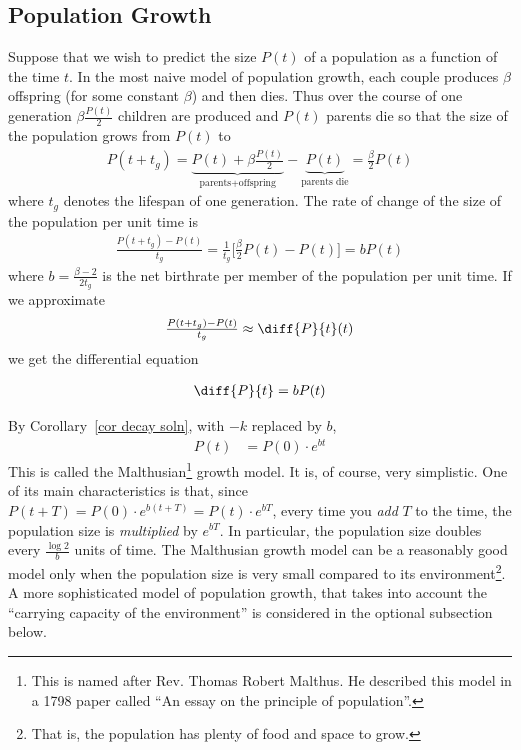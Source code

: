 \subsection{Population Growth}\label{ssec pop}

Suppose that we wish to predict the size $P(t)$ of a
population as a function of the time $t$.
In the most naive model of population growth,  each couple produces
$\beta$ offspring (for some constant $\beta$) and then dies. Thus
over the course of one generation $\beta\tfrac{P(t)}{2}$ children are
produced and $P(t)$ parents die so that the size of the population grows
from  $P(t)$ to
\begin{align*}
  P(t+t_g)= \underbrace{P(t)
+\beta\frac{P(t)}{2}}_{\text{parents+offspring}}-\underbrace{P(t)}_{\text{parents
die}}=\frac{\beta}{ 2 } P(t)
\end{align*}
where $t_g$ denotes the lifespan of one generation. The rate of change
of the size of the population per unit time is
\begin{align*}
  \frac{P(t+t_g)-P(t)}{t_g}
  =\frac{1}{t_g}\Big[\frac{\beta}{2}P(t) -P(t)\Big]
  = b P(t)
\end{align*}
where $ b=\tfrac{\beta-2}{2t_g}$ is the net birthrate per member
of the population per unit time. If we approximate
\begin{align*}
\tfrac{P(t+t_g)-P(t)}{t_g}\approx\diff{P}{t}(t)
\end{align*}
we get the differential equation
\begin{impeqn}\label{eqn simple pop}
\begin{align*}
  \diff{P}{t} = bP(t)
\end{align*}
\end{impeqn}

By Corollary~\ref{cor decay soln}, with $-k$ replaced by $b$,
\begin{align*}
P(t) &= P(0)\cdot e^{bt}
\end{align*}
This is called the Malthusian\footnote{This is named after Rev. Thomas
Robert Malthus. He described this model in a 1798 paper called ``An essay on
the principle of population''.} growth model. It is, of course, very
simplistic. One of its main characteristics is that, since $P(t+T) = P(0)\cdot
e^{b(t+T)} = P(t)\cdot e^{bT}$, every time you \emph{add} $T$ to the time, the
population size is \emph{multiplied} by $e^{bT}$. In particular, the population
size doubles every $\frac{\log 2}{b}$ units of time. The Malthusian growth model
can be a reasonably good model only when the population size is very small
compared to its environment\footnote{That is, the population has plenty of food
and space to grow.}. A more sophisticated model of population growth, that takes
into account the ``carrying capacity of the environment'' is considered in the
optional subsection below.

